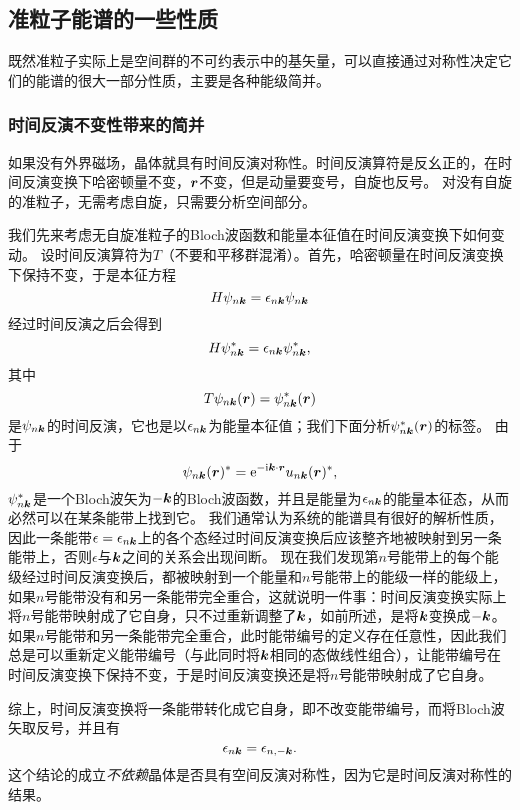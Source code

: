 \subsection{准粒子能谱的一些性质}\label{sec:quasi-particle-spectrum}

既然准粒子实际上是空间群的不可约表示中的基矢量，可以直接通过对称性决定它们的能谱的很大一部分性质，主要是各种能级简并。

\subsubsection{时间反演不变性带来的简并} 

如果没有外界磁场，晶体就具有时间反演对称性。时间反演算符是反幺正的，在时间反演变换下哈密顿量不变，$\vb*{r}$不变，但是动量要变号，自旋也反号。
对没有自旋的准粒子，无需考虑自旋，只需要分析空间部分。

我们先来考虑无自旋准粒子的Bloch波函数和能量本征值在时间反演变换下如何变动。
设时间反演算符为$T$（不要和平移群混淆）。首先，哈密顿量在时间反演变换下保持不变，于是本征方程
\[
    H \psi_{n \vb*{k}} = \epsilon_{n \vb*{k}} \psi_{n \vb*{k}}
\]
经过时间反演之后会得到
\[
    H \psi_{n \vb*{k}}^* = \epsilon_{n \vb*{k}} \psi_{n \vb*{k}}^*,
\]
其中
\[
    T \psi_{n \vb*{k}}(\vb*{r}) = \psi^*_{n \vb*{k}}(\vb*{r})
\]
是$\psi_{n \vb*{k}}$的时间反演，它也是以$\epsilon_{n \vb*{k}}$为能量本征值；我们下面分析$\psi^*_{n \vb*{k}}(\vb*{r})$的标签。
由于
\[
    \psi_{n \vb*{k}}(\vb*{r})^* = \mathrm{e}^{- \mathrm{i} \vb*{k} \cdot \vb*{r}} u_{n \vb*{k}}(\vb*{r})^*,
\]
$\psi_{n \vb*{k}}^*$是一个Bloch波矢为$-\vb*{k}$的Bloch波函数，并且是能量为$\epsilon_{n \vb*{k}}$的能量本征态，从而必然可以在某条能带上找到它。
我们通常认为系统的能谱具有很好的解析性质，因此一条能带$\epsilon = \epsilon_{n \vb*{k}}$上的各个态经过时间反演变换后应该整齐地被映射到另一条能带上，否则$\epsilon$与$\vb*{k}$之间的关系会出现间断。
现在我们发现第$n$号能带上的每个能级经过时间反演变换后，都被映射到一个能量和$n$号能带上的能级一样的能级上，如果$n$号能带没有和另一条能带完全重合，这就说明一件事：时间反演变换实际上将$n$号能带映射成了它自身，只不过重新调整了$\vb*{k}$，如前所述，是将$\vb*{k}$变换成$- \vb*{k}$。
如果$n$号能带和另一条能带完全重合，此时能带编号的定义存在任意性，因此我们总是可以重新定义能带编号（与此同时将$\vb*{k}$相同的态做线性组合），让能带编号在时间反演变换下保持不变，于是时间反演变换还是将$n$号能带映射成了它自身。

综上，时间反演变换将一条能带转化成它自身，即不改变能带编号，而将Bloch波矢取反号，并且有
\begin{equation}
    \epsilon_{n \vb*{k}} = \epsilon_{n, -\vb*{k}}.
    \label{eq:inverse-k-energy}
\end{equation}
这个结论的成立\emph{不依赖}晶体是否具有空间反演对称性，因为它是时间反演对称性的结果。

